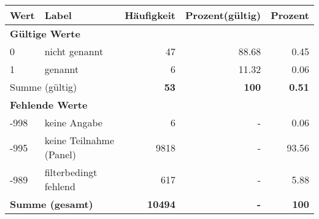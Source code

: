      \begin{longtable}{lXrrr}
     \toprule
     \textbf{Wert} & \textbf{Label} & \textbf{Häufigkeit} & \textbf{Prozent(gültig)} & \textbf{Prozent} \\
     \endhead
     \midrule
     \multicolumn{5}{l}{\textbf{Gültige Werte}}\\

     0 &
     \multicolumn{1}{X}{ nicht genannt   } &


       \num{47} &
       \num[round-mode=places,round-precision=2]{88,68} &
         \num[round-mode=places,round-precision=2]{0,45} \\

     1 &
     \multicolumn{1}{X}{ genannt   } &


       \num{6} &
       \num[round-mode=places,round-precision=2]{11,32} &
         \num[round-mode=places,round-precision=2]{0,06} \\
     \midrule
     \multicolumn{2}{l}{Summe (gültig)} &
       \textbf{\num{53}} &
     \textbf{100} &
       \textbf{\num[round-mode=places,round-precision=2]{0,51}} \\
     \multicolumn{5}{l}{\textbf{Fehlende Werte}}\\
       -998 &
       keine Angabe &
         \num{6} &
        - &
         \num[round-mode=places,round-precision=2]{0,06} \\
       -995 &
       keine Teilnahme (Panel) &
         \num{9818} &
        - &
         \num[round-mode=places,round-precision=2]{93,56} \\
       -989 &
       filterbedingt fehlend &
         \num{617} &
        - &
         \num[round-mode=places,round-precision=2]{5,88} \\
     \midrule
     \multicolumn{2}{l}{\textbf{Summe (gesamt)}} &
          \textbf{\num{10494}} &
        \textbf{-} &
        \textbf{100} \\
     \bottomrule
     \end{longtable}
     
